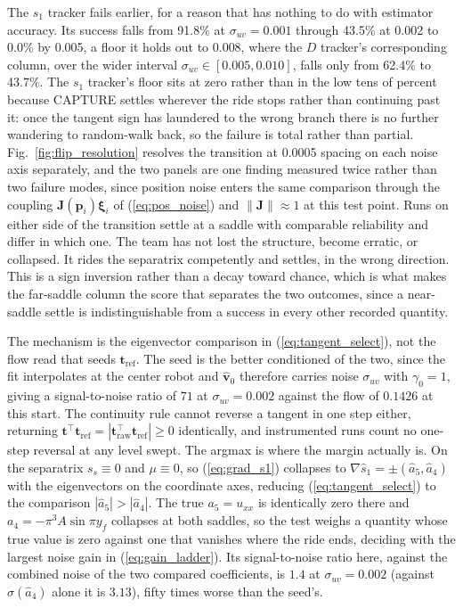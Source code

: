 \documentclass[lettersize,journal]{IEEEtran}
\begin{document}
The $s_1$ tracker fails earlier, for a reason that has nothing to do with
estimator accuracy. Its success
falls from 91.8\% at $\sigma_{uv} = 0.001$ through
43.5\% at 0.002 to 0.0\% by 0.005, a floor it holds out to 0.008, where the
$D$ tracker's corresponding column, over the wider interval
$\sigma_{uv} \in [0.005, 0.010]$, falls only from 62.4\% to 43.7\%. The
$s_1$ tracker's floor sits at zero rather than in the low tens of
percent because CAPTURE settles wherever the ride stops rather than
continuing past it: once the tangent sign has laundered to the wrong
branch there is no further wandering to random-walk back, so the
failure is total rather than partial.
Fig.~\ref{fig:flip_resolution} resolves the transition at 0.0005
spacing on each noise axis separately, and the two panels are one finding
measured twice rather than two failure modes, since position noise enters
the same comparison through the coupling
$\mathbf{J}(\mathbf{p}_i)\boldsymbol{\xi}_i$ of (\ref{eq:pos_noise}) and
$\|\mathbf{J}\| \approx 1$ at this test point. Runs on either side of the
transition settle at a saddle with comparable reliability and differ in
which one. The team has not lost the structure, become erratic, or
collapsed. It rides the separatrix competently and settles, in the wrong
direction. This is a sign inversion rather than a decay toward chance,
which is what makes the far-saddle column the score that separates the
two outcomes, since a near-saddle settle is indistinguishable from a
success in every other recorded quantity.

The mechanism is the eigenvector comparison in
(\ref{eq:tangent_select}), not the flow read that seeds
$\mathbf{t}_{\text{ref}}$. The seed is the better conditioned of the two,
since the fit interpolates at the center robot and $\hat{\mathbf{v}}_0$
therefore carries noise $\sigma_{uv}$ with $\gamma_0 = 1$, giving a
signal-to-noise ratio of $71$ at $\sigma_{uv} = 0.002$ against the flow
of $0.1426$ at this start. The continuity rule cannot reverse a tangent
in one step either, returning
$\mathbf{t}^\top\mathbf{t}_{\text{ref}} =
|\mathbf{t}_{\text{raw}}^\top\mathbf{t}_{\text{ref}}| \geq 0$
identically, and instrumented runs count no one-step reversal at any
level swept. The argmax is where the margin actually is. On the
separatrix $s_s \equiv 0$ and $\mu \equiv 0$, so (\ref{eq:grad_s1})
collapses to $\nabla\hat{s}_1 = \pm(\hat{a}_5, \hat{a}_4)$ with the
eigenvectors on the coordinate axes, reducing
(\ref{eq:tangent_select}) to the comparison $|\hat{a}_5| > |\hat{a}_4|$.
The true $a_5 = u_{xx}$ is identically zero there and $a_4 = -\pi^3 A
\sin \pi y_f$ collapses at both saddles, so the test weighs a quantity
whose true value is zero against one that vanishes where the ride ends,
deciding with the largest noise gain in (\ref{eq:gain_ladder}). Its
signal-to-noise ratio here, against the combined noise of the two
compared coefficients, is $1.4$ at $\sigma_{uv} = 0.002$ (against
$\sigma(\hat{a}_4)$ alone it is $3.13$), fifty times
worse than the seed's.
\end{document}
